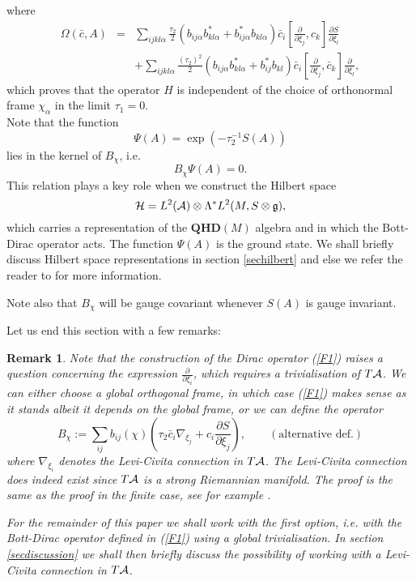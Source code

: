 \documentclass[12pt]{article}
\newcommand{\nn}{\nonumber}
\def\a{\alpha}
\def\OO{\Omega}
\def\ca{{\cal A}}
\def\ch{{\cal H}}
\newcommand{\pa}{\partial}
\newtheorem{remark}{Remark}
\begin{document}
where
\begin{eqnarray}
\OO(\bar{c}, A) &=&
 \sum_{ijkl\a} \frac{\tau_2}{2} \left(  b_{ij\a} b_{kl\a}^*+ b_{ij\a}^* b_{kl\a} \right) \bar{c}_i   \left[\frac{\pa}{\pa \xi_j }  , {c}_{k} \right]  \frac{\pa S}{\pa \xi_l }  
\nn\\&&
+ \sum_{ijkl\a} \frac{\left(\tau_2\right)^2}{2} \left(  b_{ij\a} b_{kl\a}^*+ b_{ij}^* b_{kl} \right) \bar{c}_i  \left[  \frac{\pa}{\pa \xi_j }  , \bar{c}_{k}\right]   \frac{\pa}{\pa \xi_l }     ,
\label{notzero}
\end{eqnarray}
which proves that the operator $H$ is independent of the choice of orthonormal frame $\chi_\a$ in the limit $\tau_1=0$.\\






Note that the function 
\begin{equation}
 \Psi(A) = \exp\left(- \tau_2^{-1} S(A)  \right) 
\label{groundstate}
\end{equation}
lies in the kernel of $B_\chi$, i.e.
$$
B_\chi \Psi(A)=0.
$$
This relation plays a key role when we construct the Hilbert space 
$$\ch=L^2(\ca)\otimes \Lambda^* L^2(M,S\otimes\mathfrak{g}),$$ which carries a representation of the $\mathbf{QHD}(M)$ algebra and in which the Bott-Dirac operator acts. The function $ \Psi(A)$ is the ground state. We shall briefly discuss Hilbert space representations in section \ref{sechilbert} and else we refer the reader to \cite{Aastrup:2019yui} for more information.

Note also that $B_\chi$ will be gauge covariant whenever $S(A)$ is gauge invariant.

Let us end this section with a few remarks:
\begin{remark}
Note that the construction of the Dirac operator (\ref{F1}) raises a question concerning
the expression $\frac{\pa}{\pa \xi_i}$, which requires a trivialisation of $T\ca$. We can either choose a global orthogonal frame, in which case (\ref{F1}) makes sense as it
stands albeit it depends on the global frame, or we can define 
the operator \cite{Aastrup:2019yui}
$$
B_\chi :=  \sum_{ij} b_{ij}(\chi)  \left(  \tau_2  \bar{c}_i     \nabla_{\xi_j}   +    {c}_{i} \frac{\pa S}{\pa \xi_j}\right),\qquad (\mbox{alternative def.})
$$
where $ \nabla_{\xi_i} $ denotes the Levi-Civita connection in $T\ca$. The Levi-Civita connection does indeed exist since $T\ca$ is a strong Riemannian manifold. The proof is the same as the proof in the finite case, see for example  \cite{michor}.

For the remainder of this paper we shall work with the first option, i.e. with the Bott-Dirac operator defined in (\ref{F1}) using a global trivialisation. In section \ref{secdiscussion} we shall then briefly discuss the possibility of working with a Levi-Civita connection in $T\ca$.
\end{remark}
\end{document}
